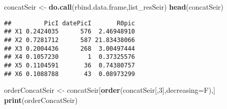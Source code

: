 \documentclass[
]{article}
\newenvironment{Shaded}{\begin{snugshade}}{\end{snugshade}}
\newcommand{\DataTypeTok}[1]{\textcolor[rgb]{0.13,0.29,0.53}{#1}}
\newcommand{\DecValTok}[1]{\textcolor[rgb]{0.00,0.00,0.81}{#1}}
\newcommand{\KeywordTok}[1]{\textcolor[rgb]{0.13,0.29,0.53}{\textbf{#1}}}
\newcommand{\NormalTok}[1]{#1}
\newcommand{\StringTok}[1]{\textcolor[rgb]{0.31,0.60,0.02}{#1}}
\begin{document}
\begin{Shaded}
\begin{Highlighting}[]
\NormalTok{concatSeir <-}\StringTok{ }\KeywordTok{do.call}\NormalTok{(rbind.data.frame,list_resSeir)}
\KeywordTok{head}\NormalTok{(concatSeir)}
\end{Highlighting}
\end{Shaded}

\begin{verbatim}
##         PicI datePicI       R0pic
## X1 0.2424035      576  2.46948910
## X2 0.7281712      587 21.83438066
## X3 0.2004436      268  3.00497444
## X4 0.1057230        1  0.37325576
## X5 0.1104591       36  0.74380757
## X6 0.1088788       43  0.08973299
\end{verbatim}

\begin{Shaded}
\begin{Highlighting}[]
\NormalTok{orderConcatSeir <-}\StringTok{ }\NormalTok{concatSeir[}\KeywordTok{order}\NormalTok{(concatSeir[,}\DecValTok{3}\NormalTok{],}\DataTypeTok{decreasing=}\NormalTok{F),]}
\KeywordTok{print}\NormalTok{(orderConcatSeir)}
\end{Highlighting}
\end{Shaded}
\end{document}
